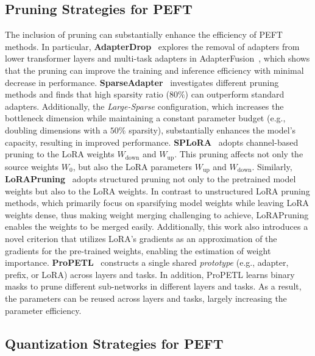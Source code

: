 \subsection{Pruning Strategies for PEFT}
\label{pruning}
The inclusion of pruning can substantially enhance the efficiency of PEFT methods. 
In particular, \textbf{AdapterDrop}~\cite{17-adapterdrop} explores the removal of adapters from lower transformer layers and multi-task adapters in AdapterFusion~\cite{4-AdapterFusion}, which shows that the pruning can improve the training and inference efficiency with minimal decrease in performance. \textbf{SparseAdapter}~\cite{35-sparseadapter} investigates different pruning methods and finds that high sparsity ratio ($80\%$) can outperform standard adapters. Additionally, the \textit{Large-Sparse} configuration, which increases the bottleneck dimension while maintaining a constant parameter budget (e.g., doubling dimensions with a $50\%$ sparsity), substantially enhances the model's capacity, resulting in improved performance. \textbf{SPLoRA}~\cite{SPlora} adopts channel-based pruning to the LoRA weights \(W_{\text{down}}\) and \(W_{\text{up}}\). This pruning affects not only the source weights $W_0$, but also the LoRA parameters $W_\text{up}$ and $W_\text{down}$.
Similarly, \textbf{LoRAPruning}~\cite{loraprune} adopts structured pruning not only to the pretrained model weights but also to the LoRA weights. In contrast to unstructured LoRA pruning methods, which primarily focus on sparsifying model weights while leaving LoRA weights dense, thus making weight merging challenging to achieve, LoRAPruning enables the weights to be merged easily. Additionally, this work also introduces a novel criterion that utilizes LoRA's gradients as an approximation of the gradients for the pre-trained weights, enabling the estimation of weight importance.
\textbf{ProPETL}~\cite{zeng2023one} constructs a single shared \emph{prototype} (e.g., adapter, prefix, or LoRA) across layers and tasks. In addition, ProPETL learns binary masks to prune different sub-networks in different layers and tasks. As a result, the parameters can be reused across layers and tasks, largely increasing the parameter efficiency.


\subsection{Quantization Strategies for PEFT}
\label{quantization}

